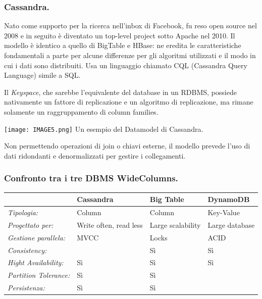 \documentclass[a4page, 11pt]{article}
\begin{document}
\subsubsection*{Cassandra.}
Nato come supporto per la ricerca nell'inbox di Facebook, fu reso open source nel 2008 e in seguito è diventato un top-level project sotto Apache nel 2010.
Il modello è identico a quello di BigTable e HBase: ne eredita le caratteristiche fondamentali a parte per alcune differenze per gli algoritmi utilizzati e il modo in cui i dati sono distribuiti.
Usa un linguaggio chiamato CQL (Cassandra Query Language) simile a SQL.

Il \textit{Keyspace}, che sarebbe l'equivalente del database in un RDBMS, possiede nativamente un fattore di replicazione e un algoritmo di replicazione, ma rimane solamente un raggruppamento di column families.
\begin{center}
	\texttt{[image: IMAGE5.png]} \newline
	Un esempio del Datamodel di Cassandra.
\end{center}

Non permettendo operazioni di join o chiavi esterne, il modello prevede l'uso di dati ridondanti e denormalizzati per gestire i collegamenti.

\subsubsection*{Confronto tra i tre DBMS WideColumns.}
\begin{center}
  \begin{tabular}{l|l|l|l}
    & \textbf{Cassandra} & \textbf{Big Table} & \textbf{DynamoDB} \\
    \hline
    \textit{Tipologia:} & Column & Column & Key-Value \\
    \textit{Progettato per:} & Write often, read less & Large scalability & Large database \\
    \textit{Gestione parallela:} & MVCC & Locks & ACID \\
    \textit{Consistency:} & & Sì & Sì \\
    \textit{Hight Availability:} & Sì & Sì & Sì \\
    \textit{Partition Tolerance:} & Sì & Sì & \\
    \textit{Persistenza:} & Sì & Sì & \\
  \end{tabular}
\end{center}
\end{document}

